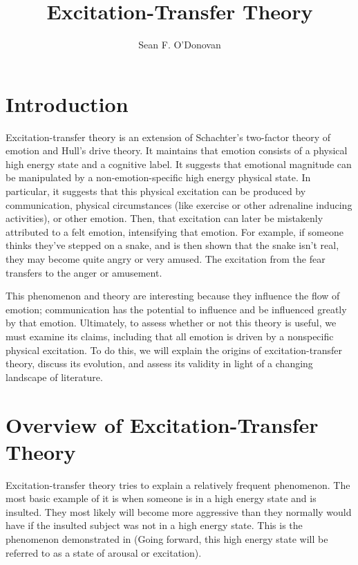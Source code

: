 \documentclass[
  stu]{apa7}
\affiliation{Brian Lamb School of Communication}
\title{Excitation-Transfer Theory}
\author{Sean F. O'Donovan}
\date{}
\begin{document}
\maketitle

\hypertarget{introduction}{%
\section{Introduction}\label{introduction}}

Excitation-transfer theory is an extension of Schachter's two-factor
theory of emotion and Hull's drive theory. It maintains that emotion
consists of a physical high energy state and a cognitive label. It
suggests that emotional magnitude can be manipulated by a
non-emotion-specific high energy physical state. In particular, it
suggests that this physical excitation can be produced by communication,
physical circumstances (like exercise or other adrenaline inducing
activities), or other emotion. Then, that excitation can later be
mistakenly attributed to a felt emotion, intensifying that emotion. For
example, if someone thinks they've stepped on a snake, and is then shown
that the snake isn't real, they may become quite angry or very amused.
The excitation from the fear transfers to the anger or amusement.

This phenomenon and theory are interesting because they influence the
flow of emotion; communication has the potential to influence and be
influenced greatly by that emotion. Ultimately, to assess whether or not
this theory is useful, we must examine its claims, including that all
emotion is driven by a nonspecific physical excitation. To do this, we
will explain the origins of excitation-transfer theory, discuss its
evolution, and assess its validity in light of a changing landscape of
literature.

\hypertarget{overview-of-excitation-transfer-theory}{%
\section{Overview of Excitation-Transfer
Theory}\label{overview-of-excitation-transfer-theory}}

Excitation-transfer theory tries to explain a relatively frequent
phenomenon. The most basic example of it is when someone is in a high
energy state and is insulted. They most likely will become more
aggressive than they normally would have if the insulted subject was not
in a high energy state. This is the phenomenon demonstrated in
\textcite{zilEffectResidualExcitation} (Going forward, this high energy
state will be referred to as a state of arousal or excitation).
\end{document}
